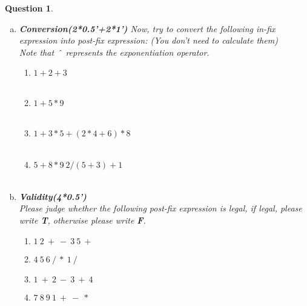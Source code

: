 \documentclass[10.5pt]{article}
\newtheorem{Q}{Question}
\begin{document}
\begin{Q}
\begin{enumerate}[(a)]
		\item \textbf{Conversion(2*0.5'+2*1')}
		Now, try to convert the following in-fix expression into post-fix expression: (You don't need to calculate them)\\
		Note that \^\ \ represents the exponentiation operator. 
		\begin{enumerate}[1) ]
			\item $ 1+2+3 $\\
			\\
			\item $ 1+5*9 $\\
			\\
			\item $ 1 + 3*5 + (2 * 4 + 6) * 8 $\\
			\\
			\item $ 5 + 8*9  \hat\   2 /(5+3)+1$\\
			\\
		\end{enumerate}
		\item \textbf{Validity(4*0.5')}\\
		Please judge whether the following post-fix expression is legal, if legal, please write \textbf{T}, otherwise please write \textbf{F}.
		\begin{enumerate}
			\item $ 1\ 2\ +\ -\ 3\ 5\ +\ $
			\item $ 4\ 5\ 6\ /\ *\ 1\ /\ $
			\item $ 1\ +\ 2\ -\ 3\ +\ 4\ $
			\item $ 7\ 8\ 9\ 1\ +\ -\ *\ $
		\end{enumerate}
	\end{enumerate}
	\end{Q}
	\pagebreak
	
\end{document}
